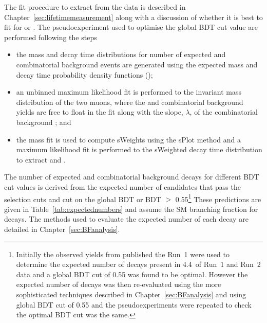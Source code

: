 The fit procedure to extract \tmumu from the data is described in Chapter~\ref{sec:lifetimemeasurement} along with a discussion of whether it is best to fit for \tmumu or \invtmumu. The pseudoexperiment used to optimise the global BDT cut value are performed following the steps
\begin{itemize}
\item the mass and decay time distributions for number of expected \bsmumu and combinatorial background events are generated using the expected mass and decay time probability density functions (\pdfs);
\item an unbinned maximum likelihood fit is performed to the invariant mass distribution of the two muons, where the \bsmumu and combinatorial background yields are free to float in the fit along with the slope, $\lambda$, of the combinatorial background \pdf; and 
\item the mass fit is used to compute sWeights using the sPlot method \cite{Pivk:2004ty} and a maximum likelihood fit is performed to the sWeighted decay time distribution to extract \tmumu and \invtmumu. 
\end{itemize}

The number of expected \bsmumu and combinatorial background decays for different BDT cut values is derived from the expected number of candidates  that pass the \el selection cuts and cut on the global BDT or BDT $>$ 0.55\footnote{Initially the observed yields from published the Run~1 \BFm were used to determine the expected number of decays present in 4.4~\fb of Run~1 and Run~2 data and a global BDT cut of 0.55 was found to be optimal. However the expected number of decays was then re-evaluated using the more sophisticated techniques described in Chapter~\ref{sec:BFanalysis} and using global BDT cut of 0.55 and the pseudoexperiments were repeated to check the optimal BDT cut was the same.} %
These predictions are given in Table~\ref{tab:expectednumbers} and assume the SM branching fraction for \bsmumu decays. %
The methods used to evaluate the expected number of each decay are detailed in Chapter~\ref{sec:BFanalysis}. 


 
